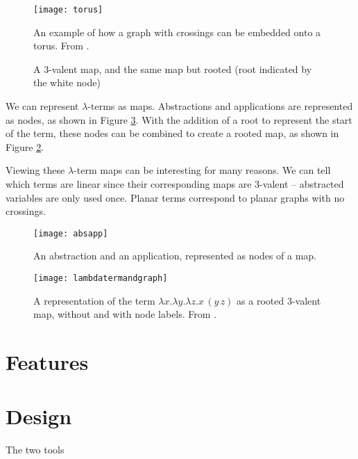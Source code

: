 \documentclass[12pt]{article}
\providecommand{\shortcite}[1]{\cite{#1}}
\begin{document}
\begin{figure}
    \centering
    \texttt{[image: torus]}
    \caption{An example of how a graph with crossings can be embedded onto a torus. From \shortcite{zeil4ct}.}
    \label{fig:torus}
\end{figure}

\begin{figure}
    \centering
    
    \caption{A 3-valent map, and the same map but rooted (root indicated by the white node)}
    \label{fig:trivalentrooted}
\end{figure}

We can represent $\lambda$-terms as maps. Abstractions and applications are represented as nodes, as shown in Figure \ref{fig:absapp}. With the addition of a root to represent the start of the term, these nodes can be combined to create a rooted map, as shown in Figure \ref{fig:trivalentrooted}.

Viewing these $\lambda$-term maps can be interesting for many reasons. We can tell which terms are linear since their corresponding maps are 3-valent -- abstracted variables are only used once. Planar terms correspond to planar graphs with no crossings.

\begin{figure}
    \centering
    \texttt{[image: absapp]}
    \caption{An abstraction and an application, represented as nodes of a map.}
    \label{fig:absapp}
\end{figure}

\begin{figure}
    \centering
    \texttt{[image: lambdatermandgraph]}
    \caption{A representation of the term $\lambda x. \lambda y. \lambda z. x \, (y \, z)$ as a rooted 3-valent map, without and with node labels. From \protect\cite{zeiljfp}.}
    \label{fig:lambdatermandgrapht}
\end{figure}

\newpage

\section{Features}


\section{Design}
\label{sec:design}

The two tools 
\end{document}
